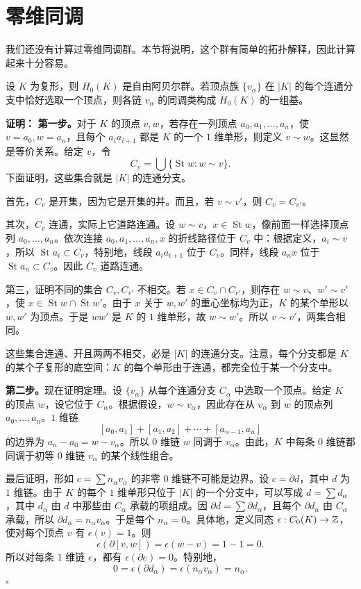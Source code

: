 \section{零维同调}
我们还没有计算过零维同调群。本节将说明，这个群有简单的拓扑解释，因此计算起来十分容易。

设 $K$ 为复形，则 $H_0(K)$ 是自由阿贝尔群。若顶点族 $\{v_\alpha\}$ 在 $|K|$ 的每个连通分支中恰好选取一个顶点，则各链 $v_\alpha$ 的同调类构成 $H_0(K)$ 的一组基。

\noindent\textbf{证明：}
\textbf{第一步。}对于 $K$ 的顶点 $v,w$，若存在一列顶点 $a_0,a_1,\ldots,a_n$，使 $v=a_0,w=a_n$，且每个 $a_i a_{i+1}$ 都是 $K$ 的一个 $1$ 维单形，则定义 $v\sim w$。这显然是等价关系。给定 $v$，令
\[
C_v=\bigcup\{\operatorname{St}w:w\sim v\}.
\]
下面证明，这些集合就是 $|K|$ 的连通分支。

首先，$C_v$ 是开集，因为它是开集的并。而且，若 $v\sim v'$，则 $C_v=C_{v'}$。

其次，$C_v$ 连通，实际上它道路连通。设 $w\sim v$，$x\in\operatorname{St}w$，像前面一样选择顶点列 $a_0,\ldots,a_n$。依次连接 $a_0,a_1,\ldots,a_n,x$ 的折线路径位于 $C_v$ 中：根据定义，$a_i\sim v$，所以 $\operatorname{St}a_i\subset C_v$，特别地，线段 $a_i a_{i+1}$ 位于 $C_v$。同样，线段 $a_nx$ 位于 $\operatorname{St}a_n\subset C_v$。因此 $C_v$ 道路连通。

第三，证明不同的集合 $C_v,C_{v'}$ 不相交。若 $x\in C_v\cap C_{v'}$，则存在 $w\sim v$、$w'\sim v'$，使 $x\in\operatorname{St}w\cap\operatorname{St}w'$。由于 $x$ 关于 $w,w'$ 的重心坐标均为正，$K$ 的某个单形以 $w,w'$ 为顶点。于是 $ww'$ 是 $K$ 的 $1$ 维单形，故 $w\sim w'$。所以 $v\sim v'$，两集合相同。

这些集合连通、开且两两不相交，必是 $|K|$ 的连通分支。注意，每个分支都是 $K$ 的某个子复形的底空间：$K$ 的每个单形由于连通，都完全位于某一个分支中。

\textbf{第二步。}现在证明定理。设 $\{v_\alpha\}$ 从每个连通分支 $C_\alpha$ 中选取一个顶点。给定 $K$ 的顶点 $w$，设它位于 $C_\alpha$。根据假设，$w\sim v_\alpha$，因此存在从 $v_\alpha$ 到 $w$ 的顶点列 $a_0,\ldots,a_n$。$1$ 维链
\[
[a_0,a_1]+[a_1,a_2]+\cdots+[a_{n-1},a_n]
\]
的边界为 $a_n-a_0=w-v_\alpha$。所以 $0$ 维链 $w$ 同调于 $v_\alpha$。由此，$K$ 中每条 $0$ 维链都同调于初等 $0$ 维链 $v_\alpha$ 的某个线性组合。

最后证明，形如 $c=\sum n_\alpha v_\alpha$ 的非零 $0$ 维链不可能是边界。设 $c=\partial d$，其中 $d$ 为 $1$ 维链。由于 $K$ 的每个 $1$ 维单形只位于 $|K|$ 的一个分支中，可以写成 $d=\sum d_\alpha$，其中 $d_\alpha$ 由 $d$ 中那些由 $C_\alpha$ 承载的项组成。因 $\partial d=\sum\partial d_\alpha$，且每个 $\partial d_\alpha$ 由 $C_\alpha$ 承载，所以 $\partial d_\alpha=n_\alpha v_\alpha$。于是每个 $n_\alpha=0$。具体地，定义同态 $\epsilon:C_0(K)\to\mathbb{Z}$，使对每个顶点 $v$ 有 $\epsilon(v)=1$。则
\[
\epsilon(\partial[v,w])=\epsilon(w-v)=1-1=0.
\]
所以对每条 $1$ 维链 $e$，都有 $\epsilon(\partial e)=0$。特别地，
\[
0=\epsilon(\partial d_\alpha)=\epsilon(n_\alpha v_\alpha)=n_\alpha.
\]\hfill$\square$

